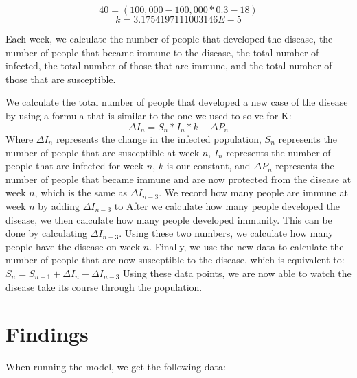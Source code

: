 \documentclass[12pt]{article} %
\begin{document}
\begin{itemize}
\[40 = (100,000 - 100,000*0.3 - 18) \]
\[k = 3.1754197111003146E-5 \]

Each week, we calculate the number of people that developed the disease, the number of people that became immune to the disease, the total number of infected, the total number of those that are immune, and the total number of those that are susceptible.

We calculate the total number of people that developed a new case of the disease by using a formula that is similar to the one we used to solve for K:
\[\Delta I_{n} = S_{n}*I_{n}*k-\Delta P_{n}\]
Where $\Delta I_{n}$ represents the change in the infected population, $S_{n}$ represents the number of people that are susceptible at week $n$, $I_{n}$ represents the number of people that are infected for week $n$, $k$ is our constant, and $\Delta P_{n}$ represents the number of people that became immune and are now protected from the disease at week $n$, which is the same as $\Delta I_{n-3}$. We record how many people are immune at week $n$ by adding $\Delta I_{n-3}$ to  After we calculate how many people developed the disease, we then calculate how many people developed immunity. This can be done by calculating $\Delta I_{n-3}$. Using these two numbers, we calculate how many people have the disease on week $n$. Finally, we use the new data to calculate the number of people that are now susceptible to the disease, which is equivalent to: $S_{n} = S_{n-1} + \Delta I_{n} - \Delta I_{n-3} $ Using these data points, we are now able to watch the disease take its course through the population.

\section*{Findings}
When running the model, we get the following data:

{\centering
{}
\\}




\end{itemize}
\end{document}
